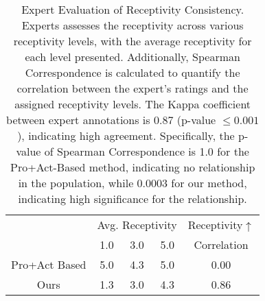 \begin{table}[tb]
\centering
\footnotesize
\begin{tabular}{ccccc}
\toprule
           & \multicolumn{3}{c}{Avg. Receptivity} & {Receptivity$\uparrow$} \\ 
           \cline{2-4}
           & 1.0          & 3.0          & 5.0         & Correlation                              \\\midrule
Pro+Act Based & 5.0          & 4.3        & 5.0          & 0.00                    \\
Ours       & 1.3        & 3.0          & 4.3         & 0.86                \\ \bottomrule
\end{tabular}
\caption{Expert Evaluation of Receptivity Consistency. Experts assesses the receptivity across various receptivity levels, with the average receptivity for each level presented. Additionally, Spearman Correspondence is calculated to quantify the correlation between the expert’s ratings and the assigned receptivity levels. The Kappa coefficient between expert annotations is 0.87 (p-value $\le 0.001$), indicating high agreement. Specifically, the p-value of Spearman Correspondence is 1.0 for the Pro+Act-Based method, indicating no relationship in the population, while 0.0003 for our method, indicating high significance for the relationship.}
\label{tab:expert_evaluation_receptivity}
\end{table}


 



